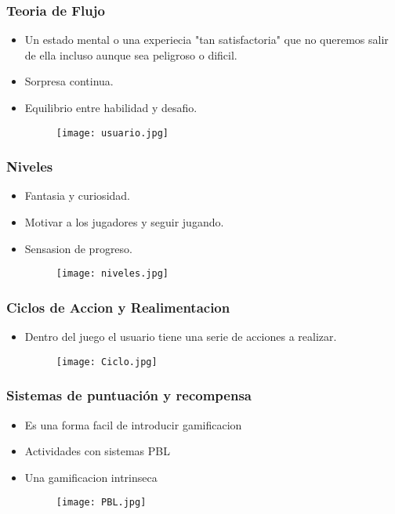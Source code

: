 \documentclass[11pt]{beamer}
\begin{document}
\begin{frame}
\frametitle{Teoria de Flujo}
\begin{itemize}
    \item Un estado mental o una experiecia "tan satisfactoria" que no queremos salir de ella incluso aunque sea peligroso o dificil.
    \item Sorpresa continua.
    \item Equilibrio entre habilidad y desafio.
    \begin{figure}
        \texttt{[image: usuario.jpg]}
        \label{fig:my_label}
    \end{figure}
\end{itemize}
\end{frame}



\begin{frame}
\frametitle{Niveles}
\begin{itemize}
    \item Fantasia y curiosidad.
    \item  Motivar a los jugadores y seguir jugando.
    \item Sensasion de progreso.
    \begin{figure}
        \texttt{[image: niveles.jpg]}
        \label{fig:my_label}
    \end{figure}
\end{itemize}
\end{frame}



\begin{frame}
\frametitle{Ciclos de Accion y Realimentacion}
\begin{itemize}
    \item Dentro del juego el usuario 
    tiene una serie de acciones a realizar.
    \begin{figure}
        \texttt{[image: Ciclo.jpg]}
        \label{fig:my_label}
    \end{figure}
\end{itemize}
\end{frame}



\begin{frame}
\frametitle{Sistemas de puntuación y recompensa}
\begin{itemize}
    \item Es una forma facil de introducir gamificacion
    \item Actividades con sistemas PBL
    \item Una gamificacion intrinseca
    \begin{figure}
        \texttt{[image: PBL.jpg]}
        \label{fig:my_label}
    \end{figure}
\end{itemize}
\end{frame}
\end{document}
